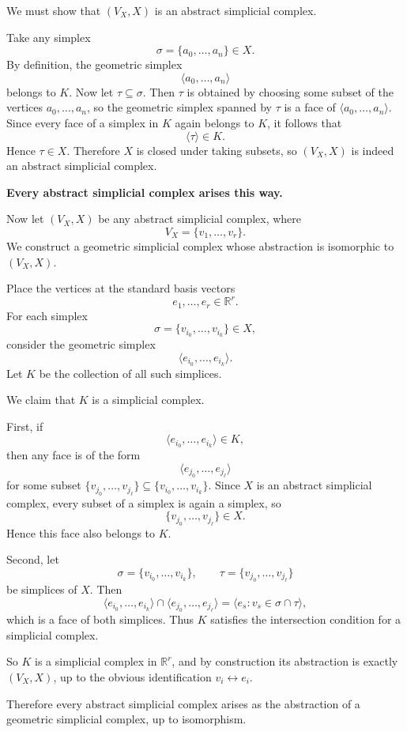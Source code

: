\documentclass[12pt,a4paper]{article}
\theoremstyle{notespace}
\begin{document}
We must show that \((V_X,X)\) is an abstract simplicial complex.

Take any simplex
\[
\sigma=\{a_0,\dots,a_n\}\in X.
\]
By definition, the geometric simplex
\[
\langle a_0,\dots,a_n\rangle
\]
belongs to \(K\). Now let \(\tau\subseteq \sigma\). Then \(\tau\) is obtained by choosing some subset of the vertices \(a_0,\dots,a_n\), so the geometric simplex spanned by \(\tau\) is a face of \(\langle a_0,\dots,a_n\rangle\). Since every face of a simplex in \(K\) again belongs to \(K\), it follows that
\[
\langle \tau\rangle\in K.
\]
Hence \(\tau\in X\). Therefore \(X\) is closed under taking subsets, so \((V_X,X)\) is indeed an abstract simplicial complex.

\medskip

\textbf{Every abstract simplicial complex arises this way.}

Now let \((V_X,X)\) be any abstract simplicial complex, where
\[
V_X=\{v_1,\dots,v_r\}.
\]
We construct a geometric simplicial complex whose abstraction is isomorphic to \((V_X,X)\).

Place the vertices at the standard basis vectors
\[
e_1,\dots,e_r\in \mathbb R^r.
\]
For each simplex
\[
\sigma=\{v_{i_0},\dots,v_{i_k}\}\in X,
\]
consider the geometric simplex
\[
\langle e_{i_0},\dots,e_{i_k}\rangle.
\]
Let \(K\) be the collection of all such simplices.

We claim that \(K\) is a simplicial complex.

First, if
\[
\langle e_{i_0},\dots,e_{i_k}\rangle\in K,
\]
then any face is of the form
\[
\langle e_{j_0},\dots,e_{j_\ell}\rangle
\]
for some subset \(\{v_{j_0},\dots,v_{j_\ell}\}\subseteq \{v_{i_0},\dots,v_{i_k}\}\). Since \(X\) is an abstract simplicial complex, every subset of a simplex is again a simplex, so
\[
\{v_{j_0},\dots,v_{j_\ell}\}\in X.
\]
Hence this face also belongs to \(K\).

Second, let
\[
\sigma=\{v_{i_0},\dots,v_{i_k}\},\qquad \tau=\{v_{j_0},\dots,v_{j_\ell}\}
\]
be simplices of \(X\). Then
\[
\langle e_{i_0},\dots,e_{i_k}\rangle\cap \langle e_{j_0},\dots,e_{j_\ell}\rangle
=
\langle e_s : v_s\in \sigma\cap\tau\rangle,
\]
which is a face of both simplices. Thus \(K\) satisfies the intersection condition for a simplicial complex.

So \(K\) is a simplicial complex in \(\mathbb R^r\), and by construction its abstraction is exactly \((V_X,X)\), up to the obvious identification \(v_i\leftrightarrow e_i\).

Therefore every abstract simplicial complex arises as the abstraction of a geometric simplicial complex, up to isomorphism.
\end{document}
